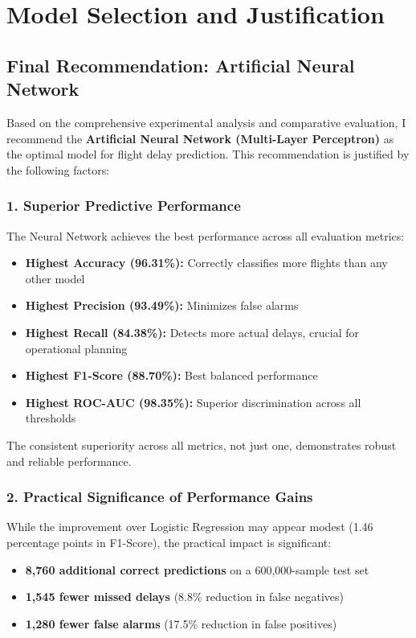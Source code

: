 \documentclass[sigconf]{acmart}
\begin{document}
\section{Model Selection and Justification}

\subsection{Final Recommendation: Artificial Neural Network}

Based on the comprehensive experimental analysis and comparative evaluation, I recommend the \textbf{Artificial Neural Network (Multi-Layer Perceptron)} as the optimal model for flight delay prediction. This recommendation is justified by the following factors:

\subsubsection{1. Superior Predictive Performance}

The Neural Network achieves the best performance across all evaluation metrics:
\begin{itemize}
    \item \textbf{Highest Accuracy (96.31\%):} Correctly classifies more flights than any other model
    \item \textbf{Highest Precision (93.49\%):} Minimizes false alarms
    \item \textbf{Highest Recall (84.38\%):} Detects more actual delays, crucial for operational planning
    \item \textbf{Highest F1-Score (88.70\%):} Best balanced performance
    \item \textbf{Highest ROC-AUC (98.35\%):} Superior discrimination across all thresholds
\end{itemize}

The consistent superiority across all metrics, not just one, demonstrates robust and reliable performance.

\subsubsection{2. Practical Significance of Performance Gains}

While the improvement over Logistic Regression may appear modest (1.46 percentage points in F1-Score), the practical impact is significant:

\begin{itemize}
    \item \textbf{8,760 additional correct predictions} on a 600,000-sample test set
    \item \textbf{1,545 fewer missed delays} (8.8\% reduction in false negatives)
    \item \textbf{1,280 fewer false alarms} (17.5\% reduction in false positives)
\end{itemize}
\end{document}
